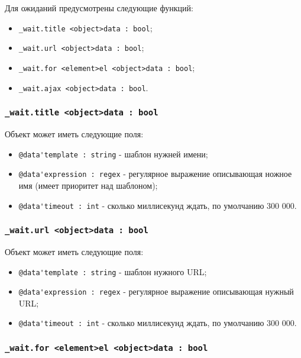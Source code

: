 \documentclass[a4paper, 14pt]{extarticle}
\newenvironment{icItems}
	{ \begin{itemize} [noitemsep,nolistsep] }
	{ \end{itemize} }
\begin{document}
Для ожиданий предусмотрены следующие функций:
\begin{icItems}
	\item \lstinline|_wait.title <object>data : bool|;
	\item \lstinline|_wait.url <object>data : bool|;
	\item \lstinline|_wait.for <element>el <object>data : bool|;
	\item \lstinline|_wait.ajax <object>data : bool|.
\end{icItems}

\subsubsection{\lstinline|_wait.title <object>data : bool|}

Объект  может иметь следующие поля:
\begin{icItems}
	\item \lstinline|@data'template : string| - шаблон нужней имени;
	\item \lstinline|@data'expression : regex| - регулярное выражение описывающая ножное имя (имеет приоритет над шаблоном);
	\item \lstinline|@data'timeout : int| - сколько миллисекунд ждать, по умолчанию 300 000.
\end{icItems}

\subsubsection{\lstinline|_wait.url <object>data : bool|}

Объект  может иметь следующие поля:
\begin{icItems}
	\item \lstinline|@data'template : string| - шаблон нужного URL;
	\item \lstinline|@data'expression : regex| - регулярное выражение описывающая нужный URL;
	\item \lstinline|@data'timeout : int| - сколько миллисекунд ждать, по умолчанию 300 000.
\end{icItems}

\subsubsection{\lstinline|_wait.for <element>el <object>data : bool|}
\end{document}
